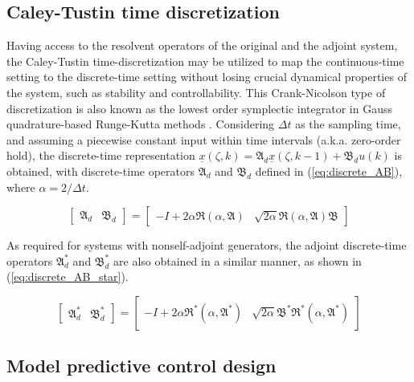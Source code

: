 \subsection{Caley-Tustin time discretization}

Having access to the resolvent operators of the original and the adjoint system, the Caley-Tustin time-discretization may be utilized to map the continuous-time setting to the discrete-time setting without losing crucial dynamical properties of the system, such as stability and controllability. This Crank-Nicolson type of discretization is also known as the lowest order symplectic integrator in Gauss quadrature-based Runge-Kutta methods \cite{hairer2006geometric}. Considering $\Delta t$ as the sampling time, and assuming a piecewise constant input within time intervals (a.k.a. zero-order hold), the discrete-time representation $\underline{x}(\zeta, k) = \mathfrak{A}_d \underline{x}(\zeta, k-1) + \mathfrak{B}_d u(k)$ is obtained, with discrete-time operators $\mathfrak{A}_d$ and $\mathfrak{B}_d$ defined in (\ref{eq:discrete_AB}), where $\alpha = 2/{\Delta t}$.

\begin{equation} \label{eq:discrete_AB}
    \begin{bmatrix}
        \mathfrak{A}_d & \mathfrak{B}_d
    \end{bmatrix} = 
    \begin{bmatrix}
        -I + 2\alpha \mathfrak{R}(\alpha, \mathfrak{A}) & \sqrt{2\alpha} \mathfrak{R}(\alpha, \mathfrak{A}) \mathfrak{B}
    \end{bmatrix}
\end{equation}

As required for systems with nonself-adjoint generators, the adjoint discrete-time operators $\mathfrak{A}_d^*$ and $\mathfrak{B}_d^*$ are also obtained in a similar manner, as shown in (\ref{eq:discrete_AB_star}).

\begin{equation} \label{eq:discrete_AB_star}
    \begin{bmatrix}
        \mathfrak{A}_d^* & \mathfrak{B}_d^*
    \end{bmatrix} = 
    \begin{bmatrix}
        -I + 2\alpha \mathfrak{R}^*(\alpha, \mathfrak{A}^*) & \sqrt{2\alpha} \mathfrak{B}^* \mathfrak{R}^*(\alpha, \mathfrak{A}^*)
    \end{bmatrix}
\end{equation}

\subsection{Model predictive control design}

